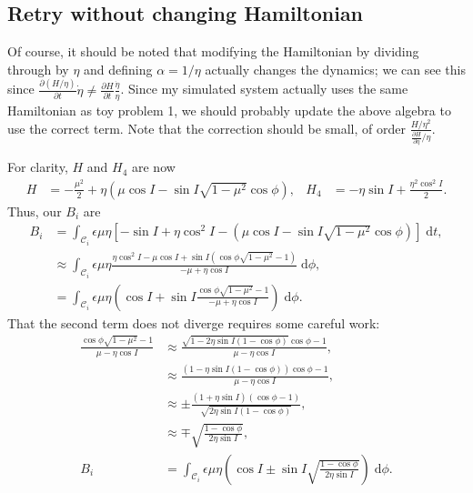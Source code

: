 \documentclass[11pt,
        usenames, %
        dvipsnames %
    ]{article}
\newcommand*{\pd}[2]{\frac{\partial#1}{\partial#2}}
\newcommand*{\p}[1]{\left(#1\right)}
\newcommand*{\s}[1]{\left[#1\right]}
\begin{document}
\subsection{Retry without changing Hamiltonian}

Of course, it should be noted that modifying the Hamiltonian by dividing through
by $\eta$ and defining $\alpha = 1/\eta$ actually changes the dynamics; we can
see this since $\pd{(H/\eta)}{t}\dot{\eta} \neq
\pd{H}{t}\frac{\dot{\eta}}{\eta}$. Since my simulated system actually uses the
same Hamiltonian as toy problem 1, we should probably update the above algebra
to use the correct term. Note that the correction should be small, of order
$\frac{H/\eta^2}{\pd{H}{\eta}/\eta}$.

For clarity, $H$ and $H_4$ are now
\begin{align*}
    H &= -\frac{\mu^2}{2}
            + \eta\p{\mu \cos I - \sin I \sqrt{1 - \mu^2}\cos \phi}, &
    H_4 &= -\eta \sin I + \frac{\eta^2 \cos^2 I}{2}.
\end{align*}
Thus, our $B_i$ are
\begin{align*}
    B_i &= \int_{\mathcal{C}_i} \epsilon \mu \eta
            \s{-\sin I + \eta \cos^2 I -
                \p{\mu \cos I - \sin I \sqrt{1 - \mu^2}\cos \phi}}
            \;\mathrm{d}t,\\
        &\approx \int_{\mathcal{C}_i} \epsilon \mu \eta
            \frac{\eta \cos^2 I - \mu \cos I
                + \sin I\p{\cos \phi \sqrt{1 - \mu^2} - 1}}{-\mu + \eta \cos I}
            \;\mathrm{d}\phi,\\
        &= \int_{\mathcal{C}_i} \epsilon \mu \eta
            \p{\cos I + \sin I \frac{\cos \phi \sqrt{1 - \mu^2} - 1}{-\mu +
            \eta \cos I}} \;\mathrm{d}\phi.
\end{align*}
That the second term does not diverge requires some careful work:
\begin{align*}
    \frac{\cos \phi\sqrt{1 - \mu^2} - 1}{\mu - \eta \cos I}
        &\approx \frac{\sqrt{1 - 2\eta \sin I\p{1 - \cos \phi}}\cos \phi
            - 1}{\mu - \eta \cos I},\\
        &\approx \frac{(1 - \eta \sin I(1 - \cos \phi))\cos \phi - 1}{
            \mu - \eta \cos I},\\
        &\approx \pm\frac{(1 + \eta \sin I)(\cos \phi - 1)}{\sqrt{2\eta \sin I
            (1 - \cos \phi)}},\\
        &\approx \mp\sqrt{\frac{1 - \cos \phi}{2\eta \sin I}},\\
    B_i &= \int_{\mathcal{C}_i} \epsilon \mu \eta
            \p{\cos I \pm \sin I
                \sqrt{\frac{1 - \cos \phi}{2\eta \sin I}}} \;\mathrm{d}\phi.
\end{align*}
\end{document}
